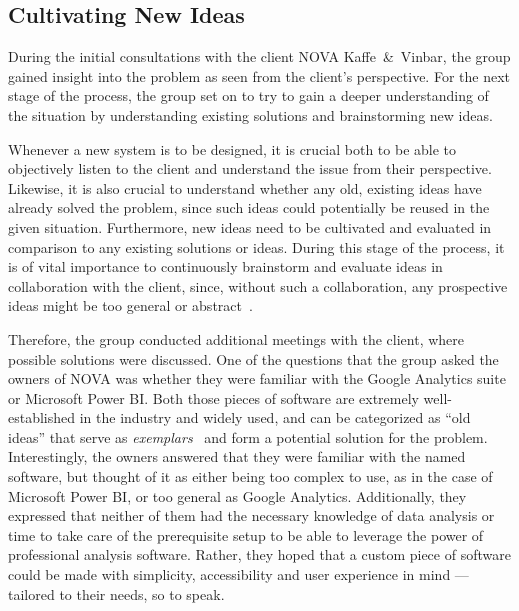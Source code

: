 \subsection{Cultivating New Ideas}\label{subsec:cultivating-new-ideas}

During the initial consultations with the client NOVA Kaffe~\&~Vinbar, the group gained insight into the problem as seen
from the client's perspective.
For the next stage of the process, the group set on to try to gain a deeper understanding of the situation by
understanding existing solutions and brainstorming new ideas.

Whenever a new system is to be designed, it is crucial both to be able to objectively listen to the client and
understand the issue from their perspective.
Likewise, it is also crucial to understand whether any old, existing ideas have already solved the problem, since such
ideas could potentially be reused in the given situation.
Furthermore, new ideas need to be cultivated and evaluated in comparison to any existing solutions or ideas.
During this stage of the process, it is of vital importance to continuously brainstorm and evaluate ideas in
collaboration with the client, since, without such a collaboration, any prospective ideas might be too general or
abstract~\cite[32]{mathiassen2018}.

Therefore, the group conducted additional meetings with the client, where possible solutions were discussed.
One of the questions that the group asked the owners of NOVA was whether they were familiar with the Google Analytics
suite or Microsoft Power BI\@.
Both those pieces of software are extremely well-established in the industry and widely used, and can be categorized as
``old ideas'' that serve as \textit{exemplars}~\cite[33]{mathiassen2018} and form a potential solution for the problem.
Interestingly, the owners answered that they were familiar with the named software, but thought of it as either being
too complex to use, as in the case of Microsoft Power BI, or too general as Google Analytics.
Additionally, they expressed that neither of them had the necessary knowledge of data analysis or time to take care of
the prerequisite setup to be able to leverage the power of professional analysis software.
Rather, they hoped that a custom piece of software could be made with simplicity, accessibility and user experience in
mind — tailored to their needs, so to speak.


